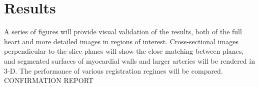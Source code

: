       
   
\section{Results}
  A series of figures will provide visual validation of the results, both of the full heart and more detailed images in regions of interest. Cross-sectional images perpendicular to the slice planes will show the close matching between planes, and segmented surfaces of myocardial walls and larger arteries will be rendered in 3-D. The performance of various registration regimes will be compared.
CONFIRMATION REPORT

\begin{figure}[htbp]
  \centering

\end{figure}
